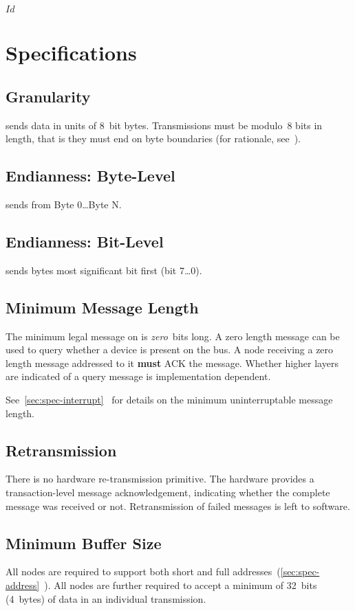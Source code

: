 \svnInfo $Id$

\section{Specifications}
\label{sec:spec}

\subsection{Granularity}
\label{sec:spec-granularity}
\bus sends data in units of 8~bit bytes. Transmissions must be modulo~8 bits
in length, that is they must end on byte boundaries (for rationale,
see~).

\subsection{Endianness: Byte-Level}
\bus sends from Byte 0{\ldots}Byte N.

\subsection{Endianness: Bit-Level}
\bus sends bytes most significant bit first (bit 7{\ldots}0).

\subsection{Minimum Message Length}
The minimum legal message on \bus is {\em zero}~bits long. A zero length
message can be used to query whether a device is present on the bus. A node
receiving a zero length message addressed to it {\bf must} ACK the message.
Whether higher layers are indicated of a query message is implementation
dependent.

See~\ref{sec:spec-interrupt}~ for details on the
minimum uninterruptable message length.

\subsection{Retransmission}
There is no hardware re-transmission primitive. The hardware provides a
transaction-level message acknowledgement, indicating whether the complete
message was received or not. Retransmission of failed messages is left to
software.

\subsection{Minimum Buffer Size}
All \bus nodes are required to support both short and full
addresses~(\ref{sec:spec-address}~). All \bus nodes
are further required to accept a minimum of 32~bits (4~bytes) of data in an
individual transmission.

